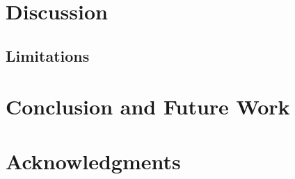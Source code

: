 \documentclass[11pt]{article}
\begin{document}
\section{Discussion}
\subsection{Limitations}
\section{Conclusion and Future Work}
\section*{Acknowledgments}






\end{document}
